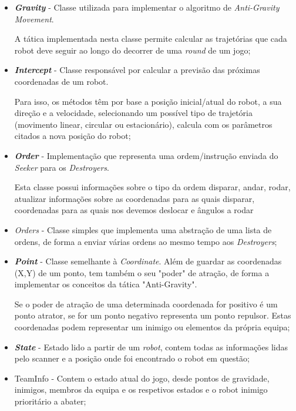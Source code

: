 \begin{itemize}
    \item \textit{\textbf{Gravity}} - Classe utilizada para implementar o algoritmo de \textit{Anti-Gravity Movement}. 
    
    A tática implementada nesta classe permite calcular as trajetórias que cada robot deve seguir ao longo do decorrer de uma \textit{round} de um jogo;
    
    \item \textit{\textbf{Intercept}} - Classe responsável por calcular a previsão das próximas coordenadas de um robot.
    
    Para isso, os métodos têm por base a posição inicial/atual do robot, a sua direção e a velocidade, selecionando um possível tipo de trajetória (movimento linear, circular ou estacionário), calcula com os parâmetros citados a nova posição do robot;
    
    \item \textit{\textbf{Order}} - Implementação que representa uma ordem/instrução enviada do \textit{Seeker} para os \textit{Destroyers}.
    
    Esta classe possui informações sobre o tipo da ordem disparar, andar, rodar, atualizar informações sobre as coordenadas para as quais disparar, coordenadas para as quais nos devemos deslocar e ângulos a rodar
    
    \item \textit{\textit{Orders}} - Classe simples que implementa uma abstração de uma lista de ordens, de forma a enviar várias ordens ao mesmo tempo aos \textit{Destroyers};
    
    \item \textit{\textbf{Point}} - Classe semelhante à \textit{Coordinate}. 
    Além de guardar as coordenadas (X,Y) de um ponto, tem também o seu "poder" de atração, de forma a implementar os conceitos da tática "Anti-Gravity". 
    
    Se o poder de atração de uma determinada coordenada for positivo é um ponto atrator, se for um ponto negativo representa um ponto repulsor. Estas coordenadas podem representar um inimigo ou elementos da própria equipa; 
    
    \item \textit{\textbf{State}} - Estado lido a partir de um \textit{robot}, contem todas as informações lidas pelo scanner e a posição onde foi encontrado o robot em questão;
    
    \item TeamInfo - Contem o estado atual do jogo, desde pontos de gravidade, inimigos, membros da equipa e os respetivos estados e  o robot inimigo prioritário a abater;
\end{itemize}


